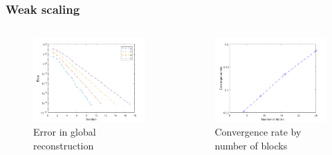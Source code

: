 \documentclass{beamer}
\begin{document}
\begin{frame}
\frametitle{Weak scaling}

\begin{columns}
	\begin{column}{0.5\textwidth}
		\begin{figure}
			\includegraphics[width=\textwidth]{FIG/MTLB_blocks_weak_error.png}
			\caption{Error in global reconstruction}
		\end{figure}
	\end{column}
	\begin{column}{0.5\textwidth}
		\begin{figure}
			\includegraphics[width=\textwidth]{FIG/MTLB_blocks_weak_conv.png}
			\caption{Convergence rate by number of blocks}
		\end{figure}
	\end{column}
\end{columns}

\end{frame}
\end{document}

